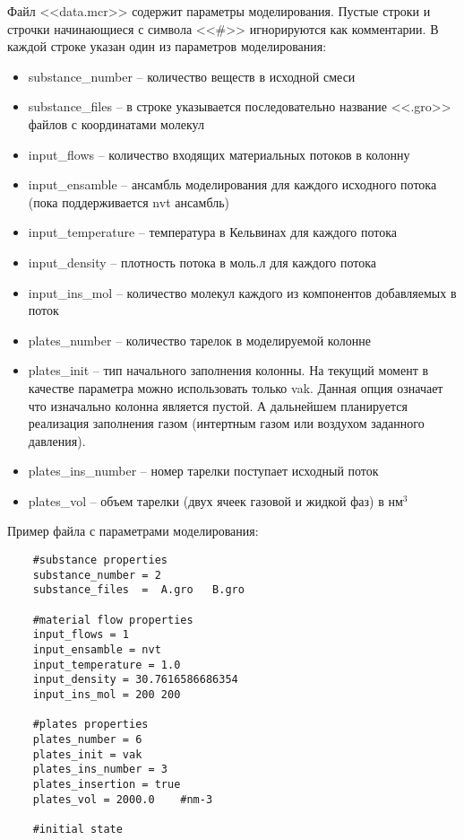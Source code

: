 Файл <<data.mcr>> содержит параметры моделирования. Пустые строки и строчки начинающиеся с символа <<\#>> игнорируются как комментарии. В каждой строке указан один из параметров моделирования:
\begin{itemize}
	\item substance\_number -- количество веществ в исходной смеси
	\item substance\_files -- в строке указывается последовательно название <<.gro>> файлов с координатами молекул 
	\item input\_flows -- количество входящих материальных потоков в колонну
	\item input\_ensamble -- ансамбль моделирования для каждого исходного потока (пока поддерживается nvt ансамбль)
	\item input\_temperature -- температура в Кельвинах для каждого потока
	\item input\_density -- плотность потока в моль.л для каждого потока
	\item input\_ins\_mol -- количество молекул каждого из компонентов добавляемых в поток
	\item plates\_number -- количество тарелок в моделируемой колонне
	\item plates\_init -- тип начального заполнения колонны. На текущий момент в качестве параметра можно использовать только vak. Данная опция означает что изначально колонна является пустой. А дальнейшем планируется реализация заполнения газом (интертным газом или воздухом заданного давления).
	\item plates\_ins\_number -- номер тарелки поступает исходный поток
	\item plates\_vol -- объем тарелки (двух ячеек газовой и жидкой фаз) в нм$^3$
	
\end{itemize}

Пример файла с параметрами моделирования:
\begin{lstlisting}
	#substance properties
	substance_number = 2
	substance_files  =  A.gro	B.gro
	
	#material flow properties
	input_flows = 1
	input_ensamble = nvt
	input_temperature = 1.0
	input_density = 30.7616586686354
	input_ins_mol = 200 200
	
	#plates properties
	plates_number = 6
	plates_init = vak
	plates_ins_number = 3
	plates_insertion = true
	plates_vol = 2000.0    #nm-3

	#initial state
\end{lstlisting}

